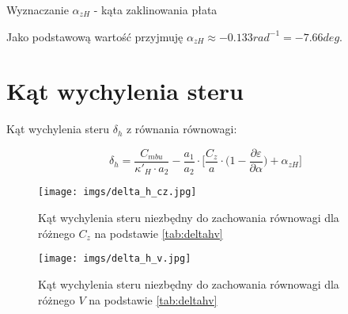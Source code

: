 \documentclass{sprawozdanie}
\begin{document}
\begin{table}[h!]
    \let\center\empty
    \centering
    \resizebox{0.99\width}{!}{}
    \caption{Wyznaczanie $\alpha_{zH}$  - kąta zaklinowania płata}
    \label{tab:azh}
\end{table}
\FloatBarrier

Jako podstawową wartość przyjmuję $\alpha_{zH} \approx -0.133 rad^{-1}= -7.66 deg$.

\section{Kąt wychylenia steru}
Kąt wychylenia steru $\delta_h$ z równania równowagi:

\begin{equation}
    \delta_h = \frac{C_{mbu}}{\kappa'_{H}\cdot a_2}-\frac{a_1}{a_2}\cdot \Bigg[\frac{C_z}{a} \cdot \Big (1- \frac{\partial \varepsilon}{\partial \alpha} \Big)+\alpha_{zH} \Bigg]
\end{equation}


\begin{figure}[h!]
    \centering
    \texttt{[image: imgs/delta\_h\_cz.jpg]}
    \caption{Kąt wychylenia steru niezbędny do zachowania równowagi dla różnego $C_z$ na podstawie \cref{tab:deltahv}}
    \label{fig:deltahcz}
\end{figure}
\FloatBarrier

\begin{figure}[h!]
    \centering
    \texttt{[image: imgs/delta\_h\_v.jpg]}

    \caption{Kąt wychylenia steru niezbędny do zachowania równowagi dla różnego $V$ na podstawie \cref{tab:deltahv}}
    \label{fig:deltahv}
\end{figure}
\FloatBarrier
\end{document}

